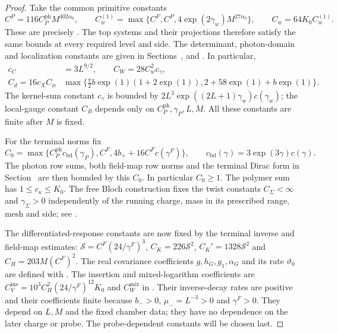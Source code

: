 \begin{proof}
Take the common primitive constants
\[
 C^P=116C_P^{\mathrm{ph}}M^{402\alpha_0},\qquad
 C_w^{(1)}=\max\{C^F,C^P,4\exp(2\gamma_w)M^{27\alpha_0}\},
 \qquad C_w=64K_0C_w^{(1)}.
\]
These are precisely .
The top systems and their projections therefore satisfy
the same bounds at every required level and side.
The determinant, photon-domain and localization constants
are given in Sections~,
 and
. In particular,
\[
 \begin{aligned}
 c_C&=3L^{9/2},\qquad C_W=28C_w^2c_\gamma,\\
 C_d=16c_XC_w
       &\max\{\tfrac\pi2b\exp(1)(1+2\exp(1)),
                                      2+58\exp(1)+b\exp(1)\}.
 \end{aligned}
\]
The kernel-sum constant $c_\gamma$ is bounded by
$2L^3\exp((2L+1)\gamma_w)c(\gamma_w)$;
the local-gauge constant $C_B$ depends only on
$C_P^{\mathrm{ph}},\gamma_P,L,M$.
All these constants are finite after $M$ is fixed.

For the terminal norms fix
\begin{equation}\label{eq:constants-terminal-calibration}
 C_0=\max\{C_P^{\mathrm{ph}}c_{\mathrm{bd}}(\gamma_P),
                 C^F,4b_++16C^Fc(\gamma^F)\},
 \qquad c_{\mathrm{bd}}(\gamma)=3\exp(3\gamma)c(\gamma).
\end{equation}
The photon row sums, both field-map row norms and the
terminal Dirac form in
Section~ are then
bounded by this $C_0$. In particular $C_0\ge1$.
The polymer sum has $1\le c_\kappa\le K_0$.
The free Bloch construction fixes the twist constants
$C_\Sigma<\infty$ and $\gamma_\Sigma>0$ independently of
the running charge, mass in its prescribed range, mesh
and side; see .

The differentiated-response constants are now fixed by
the terminal inverse and field-map estimates:
$\mathcal S=C^F(24/\gamma^F)^3$,
$C_K=226\mathcal S^2$, $C_K'=1328\mathcal S^2$ and
$C_H=203M(C^F)^2$. The real covariance coefficients
$g,h_G,g_1,\alpha_G$ and its rate $\vartheta_0$ are
defined with .
The insertion and mixed-logarithm coefficients are
$C_V^{\mathrm{ins}}=10^3C_H^2(24/\gamma^F)^{12}K_0$ and
$C_W^{\mathrm{mix}}$ in .
Their inverse-decay rates are positive and their
coefficients finite because $b_->0$,
$\mu_-=L^{-3}>0$ and $\gamma^F>0$.
They depend on $L,M$ and the fixed chamber data;
they have no dependence on the later charge or probe.
The probe-dependent constants will be chosen last.


\end{proof}
